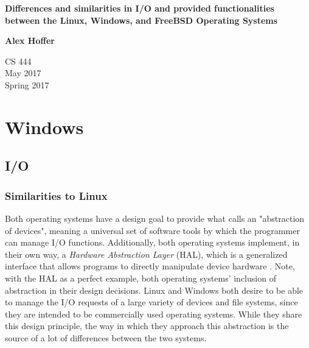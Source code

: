 \documentclass[letterpaper,10pt,titlepage]{article}
\begin{document}
\begin{titlepage}
    \begin{center}
        \vspace*{3.5cm}

        \textbf{Differences and similarities in I/O and provided functionalities between the Linux, Windows, and FreeBSD Operating Systems}

        \vspace{0.5cm}

        \textbf{Alex Hoffer}

        \vspace{0.8cm}

        CS 444\\
        May 2017\\
	Spring 2017\\

        \vfill

    \end{center}
\end{titlepage}

\newpage

\tableofcontents

\newpage



\section{Windows}
\subsection{I/O}
\subsubsection{Similarities to Linux}
Both operating systems have a design goal to provide what \cite{windowsInt2} calls an "abstraction of devices", meaning a universal set of software tools by which the programmer can manage I/O functions. Additionally, both operating systems implement, in their own way, a \emph{Hardware Abstraction Layer} (HAL), which is a generalized interface that allows programs to directly manipulate device hardware \cite{windowsInt1}.
Note, with the HAL as a perfect example, both operating systems' inclusion of abstraction in their design decisions. Linux and Windows both desire to be able to manage the I/O requests of a large variety of devices and file systems, since they are intended to be commercially used operating systems. While they share this design principle, the way in which they approach this abstraction is the source of a lot of differences between the two systems.
\end{document}
